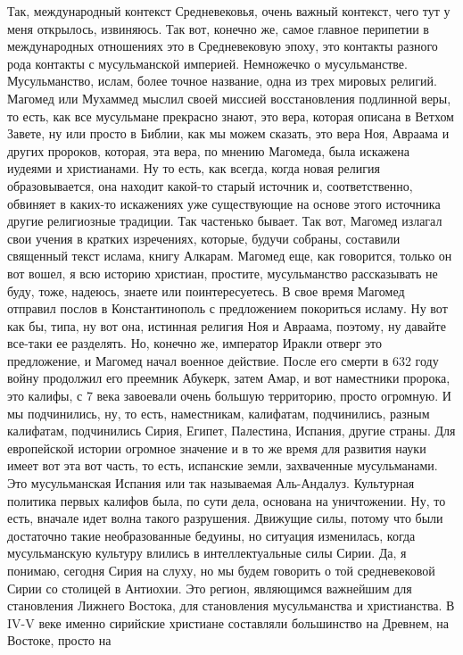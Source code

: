 Так, международный контекст Средневековья, очень важный
контекст, чего тут у меня открылось, извиняюсь. Так вот, конечно же, самое
главное перипетии в международных отношениях это в Средневековую эпоху, это
контакты разного рода контакты с мусульманской империей. Немножечко о
мусульманстве. Мусульманство, ислам, более точное название, одна из трех мировых
религий. Магомед или Мухаммед мыслил своей миссией восстановления подлинной
веры, то есть, как все мусульмане прекрасно знают, это вера, которая описана в
Ветхом Завете, ну или просто в Библии, как мы можем сказать, это вера Ноя,
Авраама и других пророков, которая, эта вера, по мнению Магомеда, была искажена
иудеями и христианами. Ну то есть, как всегда, когда новая религия
образовывается, она находит какой-то старый источник и, соответственно, обвиняет
в каких-то искажениях уже существующие на основе этого источника другие
религиозные традиции. Так частенько бывает. Так вот, Магомед излагал свои учения
в кратких изречениях, которые, будучи собраны, составили священный текст ислама,
книгу Алкарам. Магомед еще, как говорится, только он вот вошел, я всю историю
христиан, простите, мусульманство рассказывать не буду, тоже, надеюсь, знаете
или поинтересуетесь. В свое время Магомед отправил послов в Константинополь с
предложением покориться исламу. Ну вот как бы, типа, ну вот она, истинная
религия Ноя и Авраама, поэтому, ну давайте все-таки ее разделять. Но, конечно
же, император Иракли отверг это предложение, и Магомед начал военное действие.
После его смерти в 632 году войну продолжил его преемник Абукерк, затем Амар, и
вот наместники пророка, это калифы, с 7 века завоевали очень большую территорию,
просто огромную. И мы подчинились, ну, то есть, наместникам, калифатам,
подчинились, разным калифатам, подчинились Сирия, Египет, Палестина, Испания,
другие страны. Для европейской истории огромное значение и в то же время для
развития науки имеет вот эта вот часть, то есть, испанские земли, захваченные
мусульманами. Это мусульманская Испания или так называемая Аль-Андалуз.
Культурная политика первых калифов была, по сути дела, основана на уничтожении.
Ну, то есть, вначале идет волна такого разрушения. Движущие силы, потому что
были достаточно такие необразованные бедуины, но ситуация изменилась, когда
мусульманскую культуру влились в интеллектуальные силы Сирии. Да, я понимаю,
сегодня Сирия на слуху, но мы будем говорить о той средневековой Сирии со
столицей в Антиохии. Это регион, являющимся важнейшим для становления Лижнего
Востока, для становления мусульманства и христианства. В IV-V веке именно
сирийские христиане составляли большинство на Древнем, на Востоке, просто на
